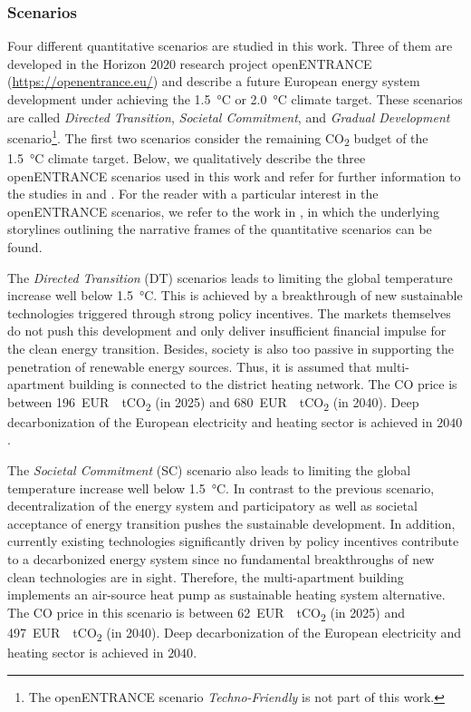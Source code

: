 \subsubsection{Scenarios}
Four different quantitative scenarios are studied in this work. Three of them are developed in the Horizon $2020$ research project openENTRANCE (\url{https://openentrance.eu/}) and describe a future European energy system development under achieving the \SI{1.5}{\degreeCelsius} or \SI{2.0}{\degreeCelsius} climate target. These scenarios are called \textit{Directed Transition}, \textit{Societal Commitment}, and \textit{Gradual Development} scenario\footnote{The openENTRANCE scenario \textit{Techno-Friendly} is not part of this work.}. The first two scenarios consider the remaining CO\textsubscript{2} budget of the \SI{1.5}{\degreeCelsius} climate target. Below, we qualitatively describe the three openENTRANCE scenarios used in this work and refer for further information to the studies in \cite{auer2020development} and \cite{auer2020quantitative}. For the reader with a particular interest in the openENTRANCE scenarios, we refer to the work in \cite{auer2019quantitative}, in which the underlying storylines outlining the narrative frames
of the quantitative scenarios can be found.\vspace{0.5cm}

The \textit{Directed Transition} (DT) scenarios leads to limiting the global temperature increase well below \SI{1.5}{\degreeCelsius}. This is achieved by a breakthrough of new sustainable technologies triggered through strong policy incentives. The markets themselves do not push this development and only deliver insufficient financial impulse for the clean energy transition. Besides, society is also too passive in supporting the penetration of renewable energy sources. Thus, it is assumed that multi-apartment building is connected to the district heating network. The CO price is between \SI{196}{EUR \per tCO_{2}} (in 2025) and \SI{680}{EUR \per tCO_{2}} (in 2040). Deep decarbonization of the European electricity and heating sector is achieved in $2040$.\vspace{0.5cm}

The \textit{Societal Commitment} (SC) scenario also leads to limiting the global temperature increase well below \SI{1.5}{\degreeCelsius}. In contrast to the previous scenario, decentralization of the energy system and participatory as well as societal acceptance of energy transition pushes the sustainable development. In addition, currently existing technologies significantly driven by policy incentives contribute to a decarbonized energy system since no fundamental breakthroughs of new clean technologies are in sight. Therefore, the multi-apartment building implements an air-source heat pump as sustainable heating system alternative. The CO price in this scenario is between \SI{62}{EUR \per tCO_{2}} (in 2025) and \SI{497}{EUR \per tCO_{2}} (in 2040). Deep decarbonization of the European electricity and heating sector is achieved in $2040$.\vspace{0.5cm}

